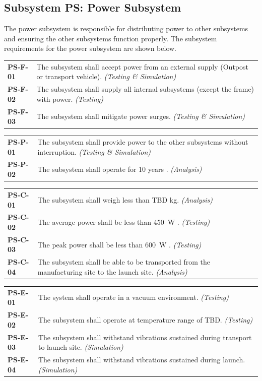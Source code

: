 \documentclass[12pt, letterpaper]{article}
\begin{document}
\subsection{Subsystem PS: Power Subsystem}
The power subsystem is responsible for distributing power to other subsystems and ensuring the other subsystems function properly. The subsystem requirements for the power subsystem are shown below.

\vspace{-5pt}
\begin{longtable}{P{2cm}P{13.75cm}}
\textbf{PS-F-01}	& The subsystem shall accept power from an external supply (Outpost or transport vehicle). \textit{(Testing \& Simulation)}																		\\
\textbf{PS-F-02}	& The subsystem shall supply all internal subsystems (except the frame) with power. \textit{(Testing)}			\\
\textbf{PS-F-03}	& The subsystem shall mitigate power surges. \textit{(Testing \& Simulation)}									\\
\end{longtable}
\vspace{-10pt}
\begin{longtable}{P{2cm}P{13.75cm}}
\textbf{PS-P-01}	& The subsystem shall provide power to the other subsystems without interruption. \textit{(Testing \& Simulation)}	\\
\textbf{PS-P-02}	& The subsystem shall operate for 10 years \cite{RFP}. \textit{(Analysis)}										\\
\end{longtable}
\vspace{-10pt}
\begin{longtable}{P{2cm}P{13.75cm}}
\textbf{PS-C-01}	& The subsystem shall weigh less than TBD \si{\kg}. \textit{(Analysis)}													\\
\textbf{PS-C-02}	& The average power shall be less than \SI{450}{\watt} \cite{RFP}. \textit{(Testing)}								\\
\textbf{PS-C-03}	& The peak power shall be less than \SI{600}{\watt} \cite{RFP}. \textit{(Testing)}										\\
\textbf{PS-C-04}	& The subsystem shall be able to be transported from the manufacturing site to the launch site. \textit{(Analysis)}	\\
\end{longtable}
\vspace{-10pt}
\begin{longtable}{P{2cm}P{13.75cm}}
\textbf{PS-E-01}	& The system shall operate in a vacuum environment. \textit{(Testing)}													\\
\textbf{PS-E-02}	& The subsystem shall operate at temperature range of TBD. \textit{(Testing)}											\\
\textbf{PS-E-03}	& The subsystem shall withstand vibrations sustained during transport to launch site. \textit{(Simulation)}		\\
\textbf{PS-E-04}	& The subsystem shall withstand vibrations sustained during launch. \textit{(Simulation)}						\\
\end{longtable}
\end{document}

